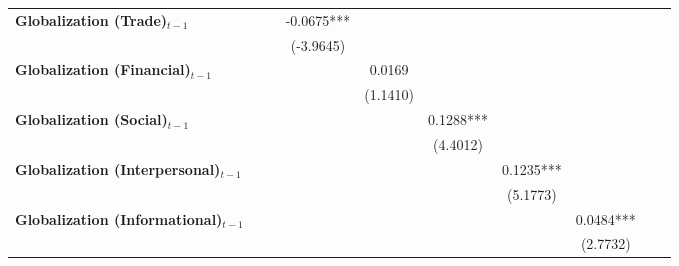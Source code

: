\begin{center}
\begin{tabular}{lccccccccc}
\textbf{Globalization (Trade)$_{t-1}$}             &                    &                    &     -0.0675***     &                    &                    &                    &                    &                    &                     \\
\textbf{ }                         &                    &                    &     (-3.9645)      &                    &                    &                    &                    &                    &                     \\
\textbf{Globalization (Financial)$_{t-1}$}             &                    &                    &                    &       0.0169       &                    &                    &                    &                    &                     \\
\textbf{ }                         &                    &                    &                    &      (1.1410)      &                    &                    &                    &                    &                     \\
\textbf{Globalization (Social)$_{t-1}$}             &                    &                    &                    &                    &     0.1288***      &                    &                    &                    &                     \\
\textbf{ }                         &                    &                    &                    &                    &      (4.4012)      &                    &                    &                    &                     \\
\textbf{Globalization (Interpersonal)$_{t-1}$}             &                    &                    &                    &                    &                    &     0.1235***      &                    &                    &                     \\
\textbf{ }                         &                    &                    &                    &                    &                    &      (5.1773)      &                    &                    &                     \\
\textbf{Globalization (Informational)$_{t-1}$}             &                    &                    &                    &                    &                    &                    &     0.0484***      &                    &                     \\
\textbf{ }                         &                    &                    &                    &                    &                    &                    &      (2.7732)      &                    &                     \\

\end{tabular}
\end{center}
